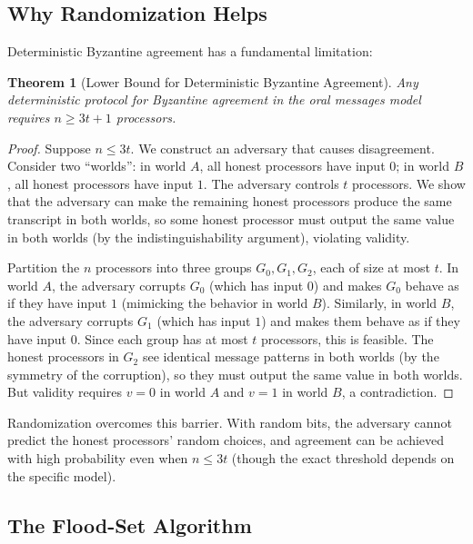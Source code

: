 \documentclass[twoside,12pt]{book}
\theoremstyle{plain}
\newtheorem{theorem}{Theorem}[chapter]
\theoremstyle{definition}
\theoremstyle{remark}
\begin{document}
\subsection{Why Randomization Helps}
\label{subsec:why-random-byzantine}

Deterministic Byzantine agreement has a fundamental limitation:

\begin{theorem}[Lower Bound for Deterministic Byzantine Agreement]
\label{thm:byzantine-lower}
Any deterministic protocol for Byzantine agreement in the oral messages model requires $n \geq 3t + 1$ processors.
\end{theorem}

\begin{proof}
Suppose $n \leq 3t$. We construct an adversary that causes disagreement. Consider two ``worlds'': in world $A$, all honest processors have input $0$; in world $B$, all honest processors have input $1$. The adversary controls $t$ processors. We show that the adversary can make the remaining honest processors produce the same transcript in both worlds, so some honest processor must output the same value in both worlds (by the indistinguishability argument), violating validity.

Partition the $n$ processors into three groups $G_0, G_1, G_2$, each of size at most $t$. In world $A$, the adversary corrupts $G_0$ (which has input $0$) and makes $G_0$ behave as if they have input $1$ (mimicking the behavior in world $B$). Similarly, in world $B$, the adversary corrupts $G_1$ (which has input $1$) and makes them behave as if they have input $0$. Since each group has at most $t$ processors, this is feasible. The honest processors in $G_2$ see identical message patterns in both worlds (by the symmetry of the corruption), so they must output the same value in both worlds. But validity requires $v = 0$ in world $A$ and $v = 1$ in world $B$, a contradiction.
\end{proof}

Randomization overcomes this barrier. With random bits, the adversary cannot predict the honest processors' random choices, and agreement can be achieved with high probability even when $n \leq 3t$ (though the exact threshold depends on the specific model).

\subsection{The Flood-Set Algorithm}
\label{subsec:flood-set}
\end{document}

